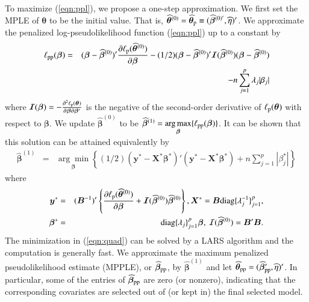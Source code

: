 \documentclass[authoryear,review, 12pt]{elsarticle}
\begin{document}
To maximize (\ref{eqn:ppl}), we propose a one-step approximation. We first set the MPLE of $\bm{\theta}$ to be the initial value.  That is, $\widehat{\bm{\theta}}^{(0)}=\widehat{\bm{\theta}}_{\rm p}\equiv(\widehat{\bm{\beta}}^{(0)'},\widehat{\eta})'$.  We approximate the penalized log-pseudolikelihood function (\ref{eqn:ppl}) up to a constant by
\begin{eqnarray}
\ell_{\rm pp}(\bm{\beta})&=&(\bm{\beta}-\widehat{\bm{\beta}}^{(0)})'\frac{\partial \ell_{\rm p}(\widehat{\bm{\theta}}^{(0)})}{\partial\bm{\beta}}-(1/2)(\bm{\beta}-\widehat{\bm{\beta}}^{(0)})'  \bm{\mathcal{I}}(\widehat{\bm{\beta}}^{(0)}) (\bm{\beta}-\widehat{\bm{\beta}}^{(0)})\nonumber\\
&&\quad\quad\quad\quad-n\sum_{j=1}^{p}\lambda_j|\beta_j|
\end{eqnarray}
where $\bm{\mathcal{I}}(\bm{\beta})=- \frac{\partial^2 \ell_{\rm p}(\bm{\theta})}{\partial\bm{\beta} \partial\bm{\beta}'}$ is the negative of the second-order derivative of $\ell_{\rm p}(\bm{\theta})$ with respect to $\bm{\beta}$. We update $\widehat{\bm{\beta}}^{(0)}$ to be $\widehat{\bm{\beta}}^{(1)}=  \underset{\bm{\beta}}{\arg\max}\{\ell_{\rm pp}(\bm{\beta})\}$. It can be shown that this solution can be attained equivalently by 
\begin{eqnarray}
\widehat{\bm{\beta}}^{(1)}&=& \underset{\bm{\beta}}{\arg\min}\left\{(1/2)(\bm{y}^{\ast}-\bm{X}^{\ast}\bm{\beta}^{\ast})' (\bm{y}^{\ast}-\bm{X}^{\ast}\bm{\beta}^{\ast}) +n\sum_{j=1}^{p}|\beta_j^\ast|\right\}
\label{eqn:quad}
\end{eqnarray}
where 
\begin{eqnarray*}
\bm{y}^{\ast}&=&(\bm{B}^{-1})'\left\{\frac{\partial\ell_{\rm p}(\widehat{\bm{\theta}}^{(0)})}{\partial\bm{\beta}} + \bm{\mathcal{I}}(\bm{\widehat{\beta}}^{(0)})\bm{\widehat{\beta}}^{(0)}\right\},
\bm{X}^{\ast}=\bm{B}{\rm diag}\{\lambda_j^{-1}\}_{j=1}^p,\\
\bm{\beta}^{\ast}&=&{\rm diag}\{\lambda_j\}_{j=1}^p\bm{\beta},\ \mathcal{I}(\bm{\widehat{\beta}}^{(0)})=\bm{B}'\bm{B}.
\end{eqnarray*}
The minimization in (\ref{eqn:quad}) can be solved by a LARS algorithm and the computation is generally fast. We approximate the maximum penalized pseudolikelihood estimate (MPPLE), or $\widehat{\bm{\beta}}_{\rm pp}$, by $\widehat{\bm{\beta}}^{(1)}$ and let $\widehat{\bm{\theta}}_{\rm pp}=(\widehat{\bm{\beta}}_{\rm pp}',\widehat{\eta})'$.  In particular, some of the entries of $\widehat{\bm{\beta}}_{\rm pp}$ are zero (or nonzero), indicating that the corresponding covariates are selected out of (or kept in) the final selected model.
\end{document}
